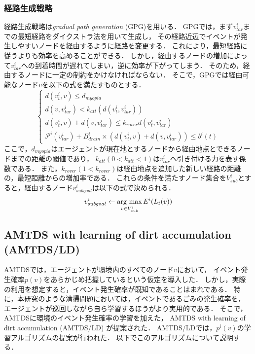 \documentclass[12pt,a4j,twoside]{jarticle}
\newcommand{\argmax}{\mathop{\rm arg~max}\limits}
\begin{document}
\subsubsection{経路生成戦略}\label{route_strategy}
  経路生成戦略は{\em gradual path generation} (GPG)を用いる．
  GPGでは，まず$v^i_{tar}$までの最短経路をダイクストラ法を用いて生成し，
  その経路近辺でイベントが発生しやすいノードを経由するように経路を変更する．
  これにより，最短経路に従うよりも効率を高めることができる．
  しかし，経由するノードの増加によって$v^i_{tar}$への到着時間が遅れてしまい，逆に効率が下がってしまう．
  そのため，経由するノードに一定の制約をかけなければならない．
  そこで，GPGでは経由可能なノード$v$を以下の式を満たすものとする．
  \begin{equation}
    \begin{cases}
      d(v^i_t, v) \leq d_{myopia} \\
      d(v, v^i_{tar}) < k_{att}(d(v^i_t, v^i_{tar})) \\
      d(v^i_t, v) + d(v, v^i_{tar}) \leq k_{rover}d(v^i_t, v^i_{tar}) \\
      \mathcal{P}^i(v^i_{tar}) + B^i_{drain} \times (d(v^i_t, v) + d(v, v^i_{tar})) \leq b^i(t)
    \end{cases}
  \end{equation}
  ここで，$d_{myopia}$はエージェントが現在地とするノードから経由地点とできるノードまでの距離の閾値であり，
  $k_{att} (0 < k_{att} < 1)$は$v^i_{tar}$へ引き付ける力を表す係数である．
  また，$k_{rover} (1 < k_{rover})$は経由地点を追加した新しい経路の距離の，最短距離からの増加率である．
  これらの条件を満たすノード集合を$V^i_{sub}$とすると，経由するノード$v^i_{subgoal}$は以下の式で決められる．
  \begin{equation}
    v^i_{subgoal} \gets \argmax_{v \in V^i_{sub}} E^i(L_t(v))
  \end{equation}

  \subsection{AMTDS with learning of dirt accumulation (AMTDS/LD)}\label{subsec:AMTDS/LD}
  AMTDSでは，エージェントが環境内のすべてのノード$v$において，
  イベント発生確率$p(v)$をあらかじめ把握しているという仮定を導入した．
  しかし，実際の利用を想定すると，イベント発生確率が既知であることはまれである．
  特に，本研究のような清掃問題においては，イベントであるごみの発生確率を，
  エージェントが巡回しながら自ら学習するほうがより実用的である．
  そこで，AMTDSに環境のイベント発生確率の学習を加えた，
  AMTDS with learning of dirt accumulation (AMTDS/LD) \cite{Sugiyama2015meta}が提案された．
  AMTDS/LDでは，$p^i(v)$の学習アルゴリズムの提案が行われた．
  以下でこのアルゴリズムについて説明する．
  \par
\end{document}
